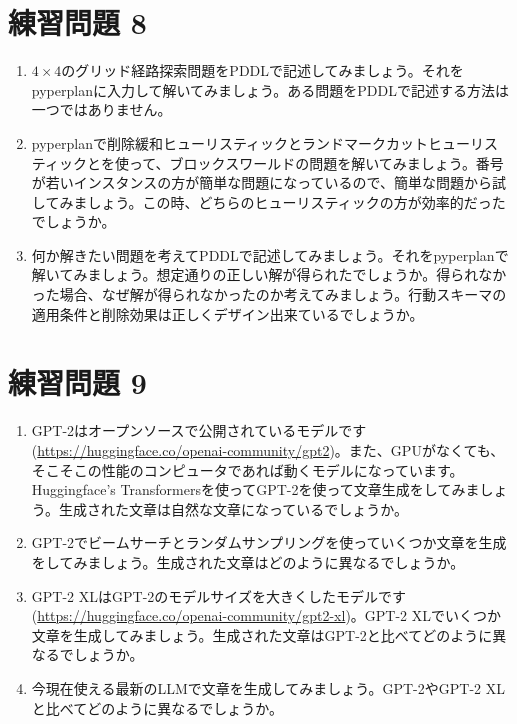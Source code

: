 \section{練習問題 8}
\begin{enumerate}
	\item $4 \times 4$のグリッド経路探索問題をPDDLで記述してみましょう。それをpyperplanに入力して解いてみましょう。ある問題をPDDLで記述する方法は一つではありません。
	
	\item pyperplanで削除緩和ヒューリスティックとランドマークカットヒューリスティックとを使って、ブロックスワールドの問題を解いてみましょう。番号が若いインスタンスの方が簡単な問題になっているので、簡単な問題から試してみましょう。この時、どちらのヒューリスティックの方が効率的だったでしょうか。
	
	\item 何か解きたい問題を考えてPDDLで記述してみましょう。それをpyperplanで解いてみましょう。想定通りの正しい解が得られたでしょうか。得られなかった場合、なぜ解が得られなかったのか考えてみましょう。行動スキーマの適用条件と削除効果は正しくデザイン出来ているでしょうか。
\end{enumerate}


\section{練習問題 9}
\begin{enumerate}
	\item GPT-2はオープンソースで公開されているモデルです (\url{https://huggingface.co/openai-community/gpt2})。また、GPUがなくても、そこそこの性能のコンピュータであれば動くモデルになっています。Huggingface's Transformersを使ってGPT-2を使って文章生成をしてみましょう。生成された文章は自然な文章になっているでしょうか。
	
    \item GPT-2でビームサーチとランダムサンプリングを使っていくつか文章を生成をしてみましょう。生成された文章はどのように異なるでしょうか。
    
    \item GPT-2 XLはGPT-2のモデルサイズを大きくしたモデルです (\url{https://huggingface.co/openai-community/gpt2-xl})。GPT-2 XLでいくつか文章を生成してみましょう。生成された文章はGPT-2と比べてどのように異なるでしょうか。
    
    \item 今現在使える最新のLLMで文章を生成してみましょう。GPT-2やGPT-2 XLと比べてどのように異なるでしょうか。
\end{enumerate}
